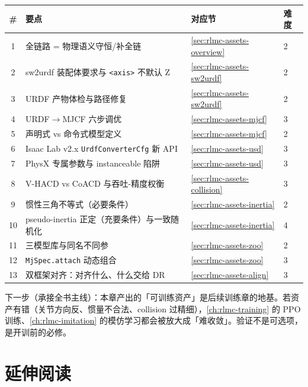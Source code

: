 \begin{center}
\small
\begin{tabular}{@{}clll@{}}
\toprule
\# & 要点 & 对应节 & 难度 \\
\midrule
1 & 全链路 = 物理语义守恒/补全链 & \cref{sec:rlmc-assets-overview} & 2 \\
2 & sw2urdf 装配体要求与 \texttt{<axis>} 不默认 Z & \cref{sec:rlmc-assets-sw2urdf} & 2 \\
3 & URDF 产物体检与路径修复 & \cref{sec:rlmc-assets-sw2urdf} & 2 \\
4 & URDF$\to$MJCF 六步调优 & \cref{sec:rlmc-assets-mjcf} & 3 \\
5 & 声明式 vs 命令式模型定义 & \cref{sec:rlmc-assets-mjcf} & 2 \\
6 & Isaac Lab v2.x \texttt{UrdfConverterCfg} 新 API & \cref{sec:rlmc-assets-usd} & 3 \\
7 & PhysX 专属参数与 instanceable 陷阱 & \cref{sec:rlmc-assets-usd} & 3 \\
8 & V-HACD vs CoACD 与吞吐-精度权衡 & \cref{sec:rlmc-assets-collision} & 3 \\
9 & 惯性三角不等式（必要条件） & \cref{sec:rlmc-assets-inertia} & 2 \\
10 & pseudo-inertia 正定（充要条件）与一致随机化 & \cref{sec:rlmc-assets-inertia} & 4 \\
11 & 三模型库与同名不同参 & \cref{sec:rlmc-assets-zoo} & 2 \\
12 & \texttt{MjSpec.\allowbreak attach} 动态组合 & \cref{sec:rlmc-assets-zoo} & 3 \\
13 & 双框架对齐：对齐什么、什么交给 DR & \cref{sec:rlmc-assets-align} & 3 \\
\bottomrule
\end{tabular}
\end{center}

下一步（承接全书主线）：本章产出的「可训练资产」是后续训练章的地基。若资产有错（关节方向反、惯量不合法、collision 过精细），\cref{ch:rlmc-training} 的 PPO 训练、\cref{ch:rlmc-imitation} 的模仿学习都会被放大成「难收敛」。验证不是可选项，是开训前的必修。

\section*{延伸阅读}
\label{sec:rlmc-assets-further}

